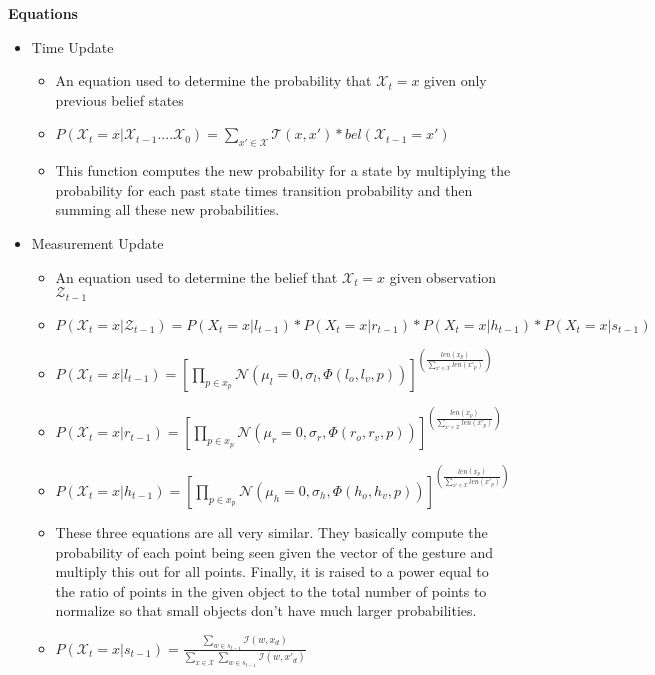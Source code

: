 \documentclass[letterpaper, 10 pt, conference]{ieeeconf}
\begin{document}
\textbf{Equations}
\begin{itemize}
\item{Time Update}
	\begin{itemize}
	\item{An equation used to determine the probability that $\mathcal{X}_t = x$ given only previous belief states}
	\item{$P(\mathcal{X}_t = x | \mathcal{X}_{t-1} .... \mathcal{X}_0) =\displaystyle\sum_{x' \in \mathcal{X}} \mathcal{T}(x, x')*bel(\mathcal{X}_{t-1} = x')$}
	\item{This function computes the new probability for a state by multiplying the probability for each past state times  transition probability and then summing all these new probabilities.}
	\end{itemize}
\item{Measurement Update}
	\begin{itemize}
	\item{An equation used to determine the belief that $\mathcal{X}_t = x$ given observation $\mathcal{Z}_{t-1}$}
	\item{$P(\mathcal{X}_t=x | \mathcal{Z}_{t-1}) = P(X_t=x | l_{t-1})*P(X_t=x | r_{t-1})*P(X_t=x |h_{t-1})*P(X_t=x | s_{t-1})$}
	\item{$P(\mathcal{X}_t=x|l_{t-1}) = [\displaystyle \prod_{p \in x_p} \mathcal{N}(\mu_l=0, \sigma_l, \Phi(l_o,l_v, p))]^{(\frac{len(x_p)}{\sum_{x'\in\mathcal{X}} len(x'_p)})}$\\}
	\item{$P(\mathcal{X}_t=x|r_{t-1}) = [\displaystyle \prod_{p \in x_p} \mathcal{N}(\mu_r=0, \sigma_r, \Phi(r_o,r_v, p))]^{(\frac{len(x_p)}{\sum_{x'\in\mathcal{X}} len(x'_p)})}$\\}
	\item{$P(\mathcal{X}_t=x|h_{t-1}) = [\displaystyle \prod_{p \in x_p} \mathcal{N}(\mu_h=0, \sigma_h, \Phi(h_o,h_v, p))]^{(\frac{len(x_p)}{\sum_{x'\in\mathcal{X}} len(x'_p)})}$\\}
	\item{These three equations are all very similar. They basically compute the probability of each point being seen given the vector of the gesture and multiply this out for all points. Finally, it is raised to a power equal to the ratio of points in the given object to the total number of points to normalize so that small objects don't have much larger probabilities.}
	\item{$P(\mathcal{X}_t=x|s_{t-1}) = \frac{\displaystyle\sum_{w\in s_{t-1}} \mathcal{I}(w, x_d)}{\displaystyle\sum_{x \in \mathcal{X}}\sum_{w\in s_{t-1}} \mathcal{I}(w, x'_d)}$}

\end{itemize}
\end{itemize}
\end{document}
